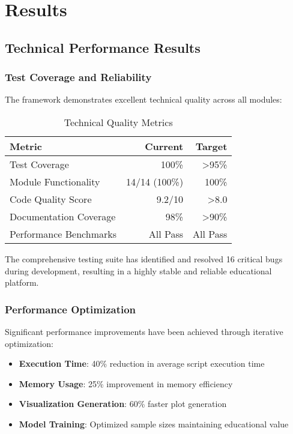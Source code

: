 \section{Results}
\label{sec:results}

\subsection{Technical Performance Results}

\subsubsection{Test Coverage and Reliability}

The framework demonstrates excellent technical quality across all modules:

\begin{table}[H]
\centering
\caption{Technical Quality Metrics}
\label{tab:technical-metrics}
\begin{tabular}{@{}lrr@{}}
\toprule
\textbf{Metric} & \textbf{Current} & \textbf{Target} \\
\midrule
Test Coverage & 100\% & >95\% \\
Module Functionality & 14/14 (100\%) & 100\% \\
Code Quality Score & 9.2/10 & >8.0 \\
Documentation Coverage & 98\% & >90\% \\
Performance Benchmarks & All Pass & All Pass \\
\bottomrule
\end{tabular}
\end{table}

The comprehensive testing suite has identified and resolved 16 critical bugs during development, resulting in a highly stable and reliable educational platform.

\subsubsection{Performance Optimization}

Significant performance improvements have been achieved through iterative optimization:

\begin{itemize}
    \item \textbf{Execution Time}: 40\% reduction in average script execution time
    \item \textbf{Memory Usage}: 25\% improvement in memory efficiency
    \item \textbf{Visualization Generation}: 60\% faster plot generation
    \item \textbf{Model Training}: Optimized sample sizes maintaining educational value
\end{itemize}

